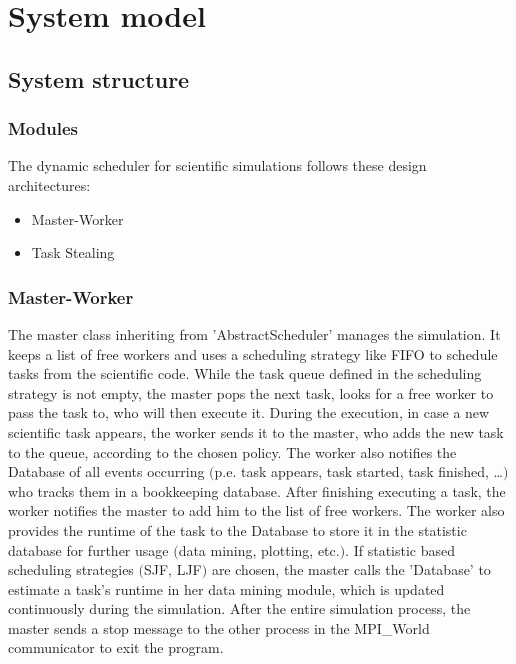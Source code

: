 \section{System model}%
	\subsection{System structure}
			\subsubsection{Modules}
The dynamic scheduler for scientific simulations follows these design architectures: \begin{itemize}
	\item {Master-Worker}
	\item {Task Stealing}
\end{itemize}

			\subsubsection{Master-Worker}
The master class inheriting from 'AbstractScheduler' manages the simulation. It keeps a list of free workers and uses a scheduling strategy like FIFO to schedule tasks from the scientific code. While the task queue defined in the scheduling strategy is not empty, the master pops the next task, looks for a free worker to pass the task to, who will then execute it.
During the execution, in case a new scientific task appears, the worker sends it to the master, who adds the new task to the queue, according to the chosen policy. The worker also notifies the Database of all events occurring $($p.e. task appears, task started, task finished, …$)$ who tracks them in a bookkeeping database.
After finishing executing a task, the worker notifies the master to add him to the list of free workers. The worker also provides the runtime of the task to the Database to store it in the statistic database for further usage $($data mining, plotting, etc.$)$.
If statistic based scheduling strategies $($SJF, LJF$)$ are chosen, the master calls the 'Database' to estimate a task's runtime in her data mining module, which is updated continuously during the simulation.
After the entire simulation process, the master sends a stop message to the other process in the MPI\_World communicator to exit the program.

